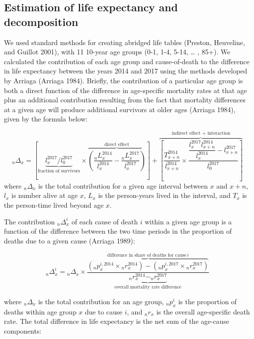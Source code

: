 \documentclass[
  11pt,
]{article}
\begin{document}
\hypertarget{estimation-of-life-expectancy-and-decomposition}{%
\subsection{\textbar{} Estimation of life expectancy and
decomposition}\label{estimation-of-life-expectancy-and-decomposition}}

We used standard methods for creating abridged life tables (Preston,
Heuveline, and Guillot 2001), with 11 10-year age groups (0-1, 1-4,
5-14, \ldots{} , 85+). We calculated the contribution of each age group
and cause-of-death to the difference in life expectancy between the
years 2014 and 2017 using the methods developed by Arriaga (Arriaga
1984). Briefly, the contribution of a particular age group is both a
direct function of the difference in age-specific mortality rates at
that age plus an additional contribution resulting from the fact that
mortality differences at a given age will produce additional survivors
at older ages (Arriaga 1984), given by the formula below:

\[ _{n}\Delta_{x}=\left[\underbrace{l_{x}^{2017}/l_{0}^{2017}}_{\textrm{fraction of survivors}}\times\overbrace{\left(\dfrac{_{n}L_{x}^{2014}}{l_{x}^{2014}}-\dfrac{_{n}L_{x}^{2017}}{l_{x}^{2017}}\right)}^{\textrm{direct effect}}\right]+\overbrace{\left[\dfrac{T_{x+n}^{2014}}{l_{x+n}^{2014}}\times\dfrac{\dfrac{l_{x}^{2017}l_{x+n}^{2014}}{l_{x}^{2014}}-l_{x+n}^{2017}}{l_{0}^{2017}}\right]}^{\textrm{indirect effect + interaction}} \]
where \(_{n}\Delta_{x}\) is the total contribution for a given age
interval between \(x\) and \(x+n\), \(l_{x}\) is number alive at age
\(x\), \(L_{x}\) is the person-years lived in the interval, and
\(T_{x}\) is the person-time lived beyond age \(x\).

The contribution \(_{n}\Delta_{x}^{i}\) of each cause of death \(i\)
within a given age group is a function of the difference between the two
time periods in the proportion of deaths due to a given cause (Arriaga
1989):

\[
_{n}\Delta_{x}^{i}={}_{n}\Delta_{x}\times\dfrac{\overbrace{\left(_{n}p_{x}^{i,2014}\times{}_{n}r_{x}^{2014}\right)-\left(_{n}p_{x}^{i,2017}\times{}_{n}r_{x}^{2017}\right)}^{\textrm{difference in share of deaths for cause}\,i}}{\underbrace{_{n}r_{x}^{2014}-_{n}r_{x}^{2017}}_{\textrm{overall mortality rate difference}}}
\]

where \(_{n}\Delta_{x}\) is the total contribution for an age group,
\(_{n}p_{x}^{i}\) is the proportion of deaths within age group \(x\) due
to cause \(i\), and \(_{n}r_{x}\) is the overall age-specific death
rate. The total difference in life expectancy is the net sum of the
age-cause components:
\end{document}
